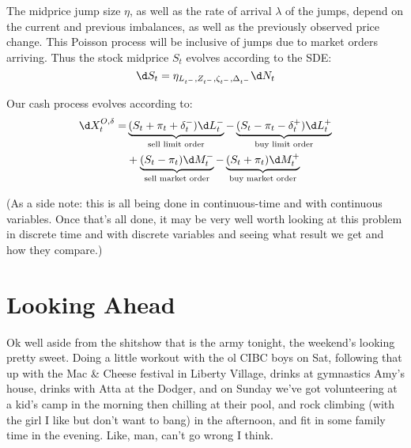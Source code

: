 \documentclass[12pt]{article}
\begin{document}
The midprice jump size $\eta$, as well as the rate of arrival $\lambda$ of the jumps, depend on the current and previous imbalances, as well as the previously observed price change. This Poisson process will be inclusive of jumps due to market orders arriving. Thus the stock midprice $S_t$ evolves according to the SDE:
\begin{equation}\label{eq:stockprocess}
\d S_t = \eta_{L_{t^-},Z_{t^-},\zeta_{t^-},\Delta_{t^-}} \d N_t
\end{equation}


Our cash process evolves according to:
\begin{equation}\label{eq:cashprocess}
\begin{split}
\d X^{O, \delta}_t = 	&\underbrace{(S_t + \pi_t + \delta^{-}_t) \d L^{-}_t}_{\text{sell limit order}} - \underbrace{(S_t - \pi_t - \delta^{+}_t) \d L^{+}_t}_{\text{buy limit order}} \\
						&+ \underbrace{(S_t - \pi_t) \d M^{-}_t}_{\text{sell market order}} - \underbrace{(S_t + \pi_t) \d M^{+}_t}_{\text{buy market order}}
\end{split}
\end{equation} 

(As a side note: this is all being done in continuous-time and with continuous variables. Once that's all done, it may be very well worth looking at this problem in discrete time and with discrete variables and seeing what result we get and how they compare.)

\section*{Looking Ahead}
Ok well aside from the shitshow that is the army tonight, the weekend's looking pretty sweet. Doing a little workout with the ol CIBC boys on Sat, following that up with the Mac \& Cheese festival in Liberty Village, drinks at gymnastics Amy's house, drinks with Atta at the Dodger, and on Sunday we've got volunteering at a kid's camp in the morning then chilling at their pool, and rock climbing (with the girl I like but don't want to bang) in the afternoon, and fit in some family time in the evening. Like, man, can't go wrong I think.
\end{document}

